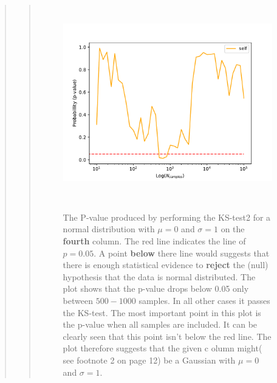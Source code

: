 \begin{quote}
\begin{quote}
\begin{figure}[!ht]
\centering
\includegraphics[width=14cm, height=8.5cm]{./Plots/1e_plot_column_3.pdf}
\label{FIG:Good}
\caption{The P-value produced by performing the KS-test2 for a normal distribution with $\mu = 0$ and $\sigma = 1$ on the \textbf{fourth} column.  The red line indicates the line of $ p = 0.05$. A point \textbf{below} there  line would suggests that there is enough statistical evidence to \textbf{reject} the (null) hypothesis that the data is normal distributed. The plot shows that the p-value drops below 0.05 only between $500-1000$ samples. In all other cases it passes the KS-test. The most important point in this plot is the p-value when all samples are included. It can be clearly seen that this point isn't below the red line. The plot therefore suggests that the given c olumn might( see footnote 2 on page 12) be a Gaussian with $\mu = 0$ and $\sigma =1$.  }
\end{figure}
\newpage


\end{quote}
\end{quote}
